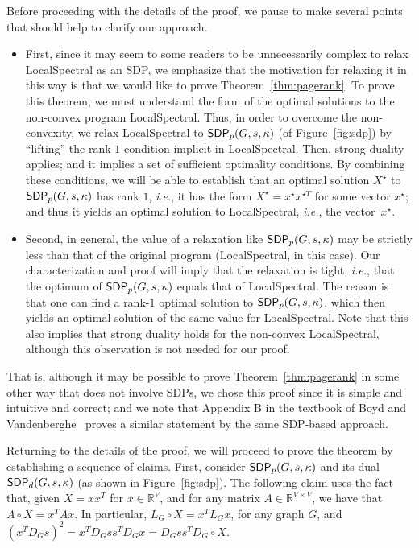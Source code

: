 \documentclass[11pt]{article}
\newcommand{\sdp}{{\sf SDP}}
\begin{document}
Before proceeding with the details of the proof, we pause to make several 
points that should help to clarify our approach.
\begin{itemize}
\item
First, since it may seem to some readers to be unnecessarily complex to relax 
\textsf{LocalSpectral} as an SDP, we emphasize that the motivation for 
relaxing it in this way is that we would like to prove 
Theorem~\ref{thm:pagerank}.
To prove this theorem, we must understand the form of the optimal solutions 
to the non-convex program \textsf{LocalSpectral}. 
Thus, in order to overcome the non-convexity, we relax \textsf{LocalSpectral} 
to $\sdp_p(G,s, \kappa)$ (of Figure~\ref{fig:sdp}) by ``lifting'' the 
rank-$1$ condition implicit in \textsf{LocalSpectral}. 
Then, strong duality applies; and it implies a set of sufficient optimality 
conditions. 
By combining these conditions, we will be able to establish that an optimal 
solution $X^{\star}$ to $\sdp_p(G,s, \kappa)$ has rank $1$, \emph{i.e.}, it has the 
form $X^{\star}=x^{\star}x^{\star T}$ for some vector $x^{\star}$; and thus it yields an optimal solution 
to \textsf{LocalSpectral}, \emph{i.e.}, the vector~$x^{\star}$. 
\item
Second, in general, the value of a relaxation like $\sdp_p(G,s, \kappa)$ 
may be strictly less than that of the original program 
(\textsf{LocalSpectral}, in this case). 
Our characterization and proof will imply that the relaxation is tight, 
\emph{i.e.}, that the optimum of $\sdp_p(G,s, \kappa)$ equals that of 
\textsf{LocalSpectral}.
The reason is that one can find a rank-$1$ optimal solution to 
$\sdp_p(G,s, \kappa)$, which then yields an optimal solution of the same 
value for \textsf{LocalSpectral}. 
Note that this also implies that strong duality holds for the non-convex 
\textsf{LocalSpectral}, although this observation is not needed for our 
proof.
\end{itemize}
\noindent
That is, although it may be possible to prove Theorem~\ref{thm:pagerank} in 
some other way that does not involve SDPs, we 
chose this proof since it is simple and intuitive and correct; and we 
note that Appendix B in the textbook of Boyd and Vandenberghe~\cite{Boyd04} 
proves a similar statement by the same SDP-based approach.




Returning to the details of the proof, we will 
proceed to prove the theorem by establishing a sequence of claims.
First, consider $\sdp_p(G,s, \kappa)$ and its dual $\sdp_d(G,s, \kappa)$ (as 
shown in Figure~\ref{fig:sdp}). 
The following claim uses the fact that, given $X=xx^T$ for 
$x \in \mathbb{R}^V$, and for any matrix $A \in \mathbb{R}^{V \times V}$, we 
have that $A \circ X = x^T A x$. 
In particular, $L_G \circ X = x^T L_G x$, for any graph $G$, and 
$(x^{T} D_{G} s)^2 = x^T D_{G} s s^T D_{G} x = D_{G}ss^TD_{G} \circ X$.
\end{document}
